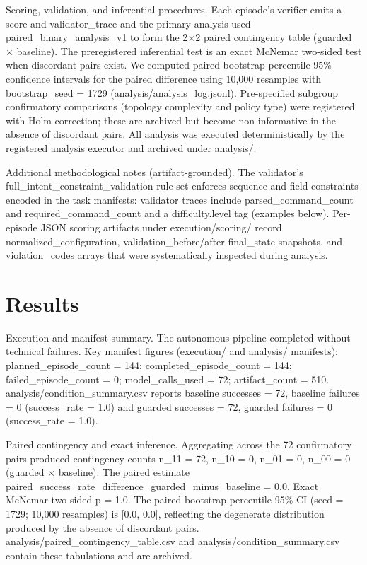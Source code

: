 \documentclass[conference]{IEEEtran}
\begin{document}
Scoring, validation, and inferential procedures. Each episode's verifier emits a score and validator\_trace and the primary analysis used paired\_binary\_analysis\_v1 to form the 2\ensuremath{\times}2 paired contingency table (guarded \ensuremath{\times} baseline). The preregistered inferential test is an exact McNemar two-sided test when discordant pairs exist. We computed paired bootstrap-percentile 95\% confidence intervals for the paired difference using 10,000 resamples with bootstrap\_seed = 1729 (analysis/analysis\_log.jsonl). Pre-specified subgroup confirmatory comparisons (topology complexity and policy type) were registered with Holm correction; these are archived but become non-informative in the absence of discordant pairs. All analysis was executed deterministically by the registered analysis executor and archived under analysis/.

Additional methodological notes (artifact-grounded). The validator's full\_intent\_constraint\_validation rule set enforces sequence and field constraints encoded in the task manifests: validator traces include parsed\_command\_count and required\_command\_count and a difficulty.level tag (examples below). Per-episode JSON scoring artifacts under execution/scoring/ record normalized\_configuration, validation\_before/after final\_state snapshots, and violation\_codes arrays that were systematically inspected during analysis.

\section{Results}
Execution and manifest summary. The autonomous pipeline completed without technical failures. Key manifest figures (execution/ and analysis/ manifests): planned\_episode\_count = 144; completed\_episode\_count = 144; failed\_episode\_count = 0; model\_calls\_used = 72; artifact\_count = 510. analysis/condition\_summary.csv reports baseline successes = 72, baseline failures = 0 (success\_rate = 1.0) and guarded successes = 72, guarded failures = 0 (success\_rate = 1.0).

Paired contingency and exact inference. Aggregating across the 72 confirmatory pairs produced contingency counts n\_11 = 72, n\_10 = 0, n\_01 = 0, n\_00 = 0 (guarded \ensuremath{\times} baseline). The paired estimate paired\_success\_rate\_difference\_guarded\_minus\_baseline = 0.0. Exact McNemar two-sided p = 1.0. The paired bootstrap percentile 95\% CI (seed = 1729; 10,000 resamples) is [0.0, 0.0], reflecting the degenerate distribution produced by the absence of discordant pairs. analysis/paired\_contingency\_table.csv and analysis/condition\_summary.csv contain these tabulations and are archived.
\end{document}
